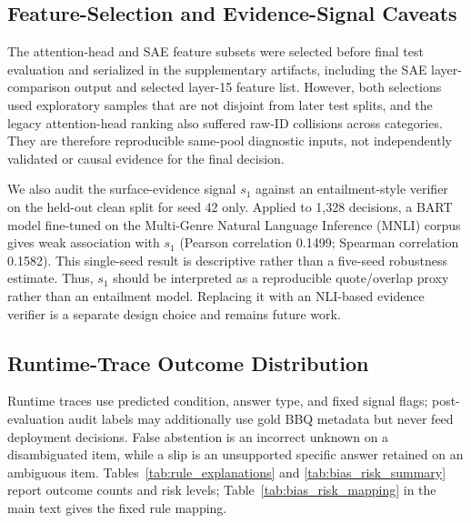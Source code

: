 \documentclass{ieeeaccess}
\begin{document}
\subsection{Feature-Selection and Evidence-Signal Caveats}
\label{app:feature_caveats}
The attention-head and SAE feature subsets were selected before final test evaluation and serialized in the supplementary artifacts, including the SAE layer-comparison output and selected layer-15 feature list. However, both selections used exploratory samples that are not disjoint from later test splits, and the legacy attention-head ranking also suffered raw-ID collisions across categories. They are therefore reproducible same-pool diagnostic inputs, not independently validated or causal evidence for the final decision.

We also audit the surface-evidence signal $s_1$ against an entailment-style verifier on the held-out clean split for seed 42 only. Applied to 1,328 decisions, a BART model fine-tuned on the Multi-Genre Natural Language Inference (MNLI) corpus \cite{lewis2020bart,williams2018mnli,bartMNLICard} gives weak association with $s_1$ (Pearson correlation 0.1499; Spearman correlation 0.1582). This single-seed result is descriptive rather than a five-seed robustness estimate. Thus, $s_1$ should be interpreted as a reproducible quote/overlap proxy rather than an entailment model. Replacing it with an NLI-based evidence verifier is a separate design choice and remains future work.

\subsection{Runtime-Trace Outcome Distribution}
\label{app:explanations}
Runtime traces use predicted condition, answer type, and fixed signal flags; post-evaluation audit labels may additionally use gold BBQ metadata but never feed deployment decisions. False abstention is an incorrect unknown on a disambiguated item, while a slip is an unsupported specific answer retained on an ambiguous item.
Tables~\ref{tab:rule_explanations} and \ref{tab:bias_risk_summary} report outcome counts and risk levels; Table~\ref{tab:bias_risk_mapping} in the main text gives the fixed rule mapping.
\end{document}
